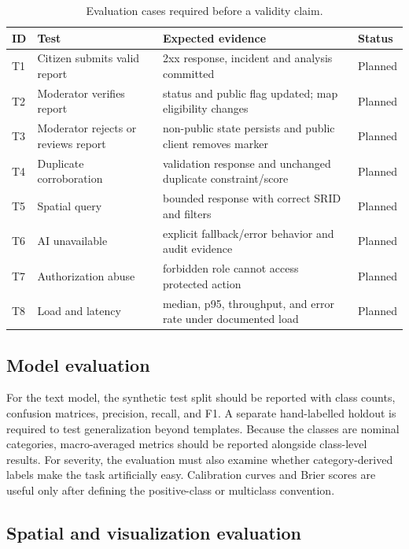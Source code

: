 \documentclass[11pt]{article}
\begin{document}
\begin{table}[H]
\centering
\caption{Evaluation cases required before a validity claim.}
\label{tab:tests}
\small
\begin{tabularx}{\textwidth}{p{}p{}p{}X}
\toprule
\textbf{ID} & \textbf{Test} & \textbf{Expected evidence} & \textbf{Status}\\
\midrule
T1 & Citizen submits valid report & 2xx response, incident and analysis committed & Planned\\
T2 & Moderator verifies report & status and public flag updated; map eligibility changes & Planned\\
T3 & Moderator rejects or reviews report & non-public state persists and public client removes marker & Planned\\
T4 & Duplicate corroboration & validation response and unchanged duplicate constraint/score & Planned\\
T5 & Spatial query & bounded response with correct SRID and filters & Planned\\
T6 & AI unavailable & explicit fallback/error behavior and audit evidence & Planned\\
T7 & Authorization abuse & forbidden role cannot access protected action & Planned\\
T8 & Load and latency & median, p95, throughput, and error rate under documented load & Planned\\
\bottomrule
\end{tabularx}
\end{table}

\subsection{Model evaluation}

For the text model, the synthetic test split should be reported with class
counts, confusion matrices, precision, recall, and F1. A separate
hand-labelled holdout is required to test generalization beyond templates.
Because the classes are nominal categories, macro-averaged metrics should be
reported alongside class-level results. For severity, the evaluation must
also examine whether category-derived labels make the task artificially
easy. Calibration curves and Brier scores are useful only after defining
the positive-class or multiclass convention.

\subsection{Spatial and visualization evaluation}
\end{document}
